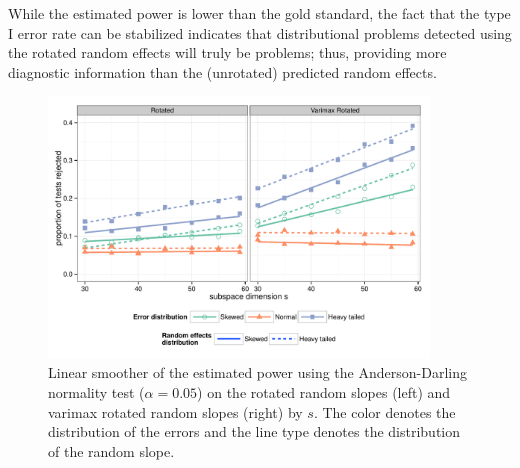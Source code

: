 \documentclass[12pt]{article} %
\begin{document}
While the estimated power is lower than the gold standard, the fact that the type I error rate can be stabilized indicates that distributional problems detected using the rotated random effects will truly be problems; thus, providing more diagnostic information than the (unrotated) predicted random effects.


\begin{figure}
	\centering
	\includegraphics[width=0.9\textwidth]{ad_slope_power.pdf}
	\caption{\label{fig:power-slope}Linear smoother of the estimated power using the Anderson-Darling normality test ($\alpha = 0.05$) on the rotated random slopes (left) and varimax rotated random slopes (right) by $s$. The color denotes the distribution of the errors and the line type denotes the distribution of the random slope.}
\end{figure}
\end{document}
